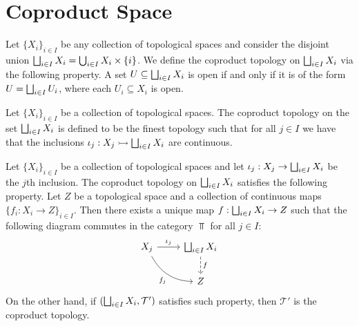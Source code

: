 \section{Coproduct Space}

\begin{definition}
  Let \(\{X_i\}_{i \in I}\) be any collection of topological spaces and consider
  the disjoint union \(\bigsqcup_{i \in I} X_i = \bigcup_{i \in  I} X_i \times
  \{i\}\). We define the coproduct topology on \(\bigsqcup_{i \in I} X_i\) via the
  following property. A set \(U \subseteq \bigsqcup_{i \in I} X_i\) is open if and
  only if it is of the form \(U = \bigsqcup_{i \in I} U_i\), where each \(U_i
  \subseteq X_i\) is open.
\end{definition}

\begin{definition}\label{def: coproduct top}
  Let \(\{X_i\}_{i \in I}\) be a collection of topological spaces. The coproduct
  topology on the set \(\bigsqcup_{i \in I} X_i\) is defined to be the finest
  topology such that for all \(j \in I\) we have that the inclusions \(\iota_j:
  X_j \rightarrowtail \bigsqcup_{i \in I} X_i\) are continuous.
\end{definition}

\begin{theorem}
  \label{thm: coprod top universal property}
  Let \(\{X_i\}_{i \in I}\) be a collection of topological spaces and let
  \(\iota_j: X_j \to \bigsqcup_{i \in I} X_i\) be the \(j\)th inclusion. The
  coproduct topology on \(\bigsqcup_{i \in I} X_i\) satisfies the following
  property. Let \(Z\) be a topological space and a collection of continuous maps
  \(\{f_i: X_i \to Z\}_{i \in I}\). Then there exists a unique map \(f:
  \bigsqcup_{i \in I} X_i \to Z\) such that the following diagram commutes in the
  category \(\Top\) for all \(j \in I\):
  \[
    \begin{tikzcd}
      X_j \ar[r, "\iota_j"]  \ar[rd, swap, bend right, "f_j"]
      & \bigatt_{i \in I} X_i \ar[d, dashed, "f"] \\ &Z
    \end{tikzcd}
  \]
  On the other hand, if \((\bigsqcup_{i \in I} X_i, \mathcal T')\) satisfies such
  property, then \(\mathcal T'\) is the coproduct topology.
\end{theorem}

